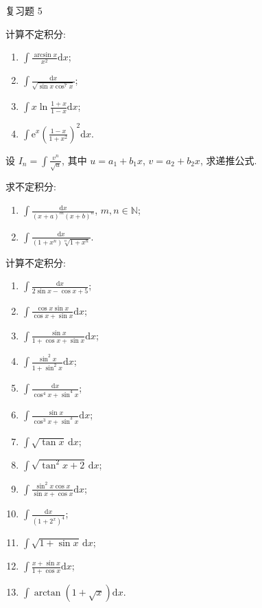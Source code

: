 \begin{exblock}{复习题 5}

\item 计算不定积分:
\begin{enumerate}[label=(\arabic*)]
  \item $\int\frac{\arcsin x}{x^{2}}\mathrm{d}x$;
  \item $\int\frac{\mathrm{d}x}{\sqrt{\sin x\cos^{7}x}}$;
  \item $\int x\ln\frac{1+x}{1-x}\mathrm{d}x$;
  \item $\int\mathrm{e}^{x}\left(\frac{1-x}{1+x^{2}}\right)^{2}\mathrm{d}x$.
\end{enumerate}

\item 设 $I_{n}=\int\frac{v^{n}}{\sqrt{u}}$, 其中 $u=a_{1}+b_{1}x$, $v=a_{2}+b_{2}x$, 求递推公式.

\item 求不定积分:
\begin{enumerate}[label=(\arabic*)]
  \item $\int\frac{\mathrm{d}x}{(x+a)^{m}(x+b)^{n}}$, $m,n\in\mathbb{N}$;
  \item $\int\frac{\mathrm{d}x}{(1+x^{n})\sqrt[n]{1+x^{n}}}$.
\end{enumerate}

\item 计算不定积分:
\begin{enumerate}[label=(\arabic*)]
  \item $\int\frac{\mathrm{d}x}{2\sin x-\cos x+5}$;
  \item $\int\frac{\cos x\sin x}{\cos x+\sin x}\mathrm{d}x$;
  \item $\int\frac{\sin x}{1+\cos x+\sin x}\mathrm{d}x$;
  \item $\int\frac{\sin^{2}x}{1+\sin^{2}x}\mathrm{d}x$;
  \item $\int\frac{\mathrm{d}x}{\cos^{4}x+\sin^{4}x}$;
  \item $\int\frac{\sin x}{\cos^{3}x+\sin^{3}x}\mathrm{d}x$;
  \item $\int\sqrt{\tan x}\,\mathrm{d}x$;
  \item $\int\sqrt{\tan^{2}x+2}\,\mathrm{d}x$;
  \item $\int\frac{\sin^{2}x\cos x}{\sin x+\cos x}\mathrm{d}x$;
  \item $\int\frac{\mathrm{d}x}{(1+2^{x})^{4}}$;
  \item $\int\sqrt{1+\sin x}\,\mathrm{d}x$;
  \item $\int\frac{x+\sin x}{1+\cos x}\mathrm{d}x$;
  \item $\int\arctan(1+\sqrt{x})\mathrm{d}x$.
\end{enumerate}
\end{exblock}
